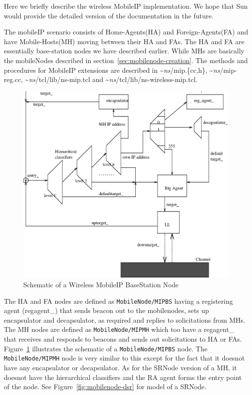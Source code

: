 Here we briefly describe the wireless MobileIP implementation. We hope
that Sun would provide the detailed version of the documentation in
the future.

The mobileIP scenario consists of Home-Agents(HA) and
Foreign-Agents(FA) and have Mobile-Hosts(MH) moving between their HA
and FAs.
The HA and FA are essentially base-station nodes we have described
earlier. While MHs are basically the mobileNodes described in
section~\ref{sec:mobilenode-creation}.
The methods and procedures for MobileIP extensions are described in
\textasciitilde\emph{ns}/{mip.\{cc,h\}}, \textasciitilde\emph{ns}/{mip-reg.cc}, \textasciitilde\emph{ns}/{tcl/lib/ns-mip.tcl} and
\textasciitilde\emph{ns}/{tcl/lib/ns-wireless-mip.tcl}.

\begin{figure}
    \centerline{\includegraphics{wireless-mip}}
    \caption{Schematic of a Wireless MobileIP BaseStation Node}
    \label{fig:mobilenode-wireless-mip}
\end{figure}
The HA and FA nodes are defined as {\tt MobileNode/MIPBS} having a
registering agent (regagent\_) that sends beacon out to the
mobilenodes, sets up encapsulator and decapsulator, as required and
replies to solicitations from MHs. 
The MH nodes are defined as {\tt MobileNode/MIPMH} which too have a
regagent\_ that receives and responds to beacons and sends out
solicitations to HA or FAs. Figure~\ref{fig:mobilenode-wireless-mip}
illustrates the schematic of a {\tt MobileNode/MIPBS} 
node. The {\tt MobileNode/MIPMH} node is very similar to this except
for the fact that it doesnot have any encapsulator or decapsulator. As
for the SRNode version of a MH, it doesnot have the hierarchical
classifiers and the RA agent forms the entry point of the node. See
Figure~\ref{fig:mobilenode-dsr} for model of a SRNode. 

